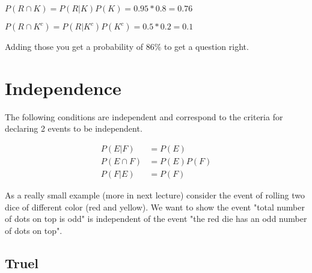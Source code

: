 \documentclass[12pt]{article}
\begin{document}
$P(R \cap K) = P(R|K)P(K) = 0.95 * 0.8 = 0.76$

$P(R \cap K^c) = P(R|K^c)P(K^c) = 0.5 * 0.2 = 0.1$

Adding those you get a probability of 86\% to get a question right.

\section*{Independence}

The following conditions are independent and correspond to the criteria for declaring 2 events to be independent.

\begin{align*}
P(E|F) &= P(E) \\
P(E \cap F) &= P(E)P(F) \\
P(F|E) &= P(F)
\end{align*}

\medskip

As a really small example (more in next lecture) consider the event of rolling two dice of different color (red and yellow). We want to show the event "total number of dots on top is odd" is independent of the event "the red die has an odd number of dots on top".


\subsection*{Truel}
\end{document}
